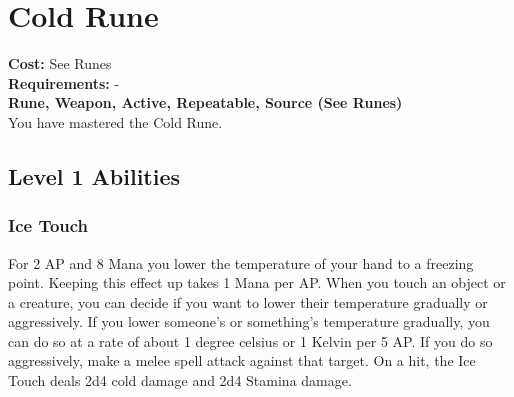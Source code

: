 \twocolumn
\section{Cold Rune}\label{rune:cold}
\textbf{Cost:} See Runes\\
\textbf{Requirements:} -\\
\textbf{Rune, Weapon, Active, Repeatable, Source (See Runes)}\\
You have mastered the Cold Rune.

\subsection{Level 1 Abilities}

\subsubsection{Ice Touch}
For 2 AP and 8 Mana you lower the temperature of your hand to a freezing point.
Keeping this effect up takes 1 Mana per AP.
When you touch an object or a creature, you can decide if you want to lower their temperature gradually or aggressively.
If you lower someone's or something's temperature gradually, you can do so at a rate of about 1 degree celsius or 1 Kelvin per 5 AP.
If you do so aggressively, make a melee spell attack against that target.
On a hit, the Ice Touch deals 2d4 cold damage and 2d4 Stamina damage.